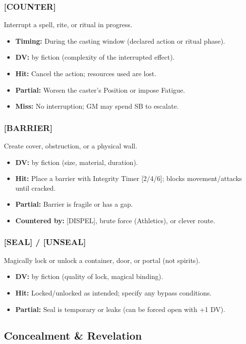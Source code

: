 \subsubsection{[COUNTER]}
Interrupt a spell, rite, or ritual in progress.
\begin{itemize}
  \item \textbf{Timing:} During the casting window (declared action or ritual phase).
  \item \textbf{DV:} by fiction (complexity of the interrupted effect).
  \item \textbf{Hit:} Cancel the action; resources used are lost.
  \item \textbf{Partial:} Worsen the caster's Position or impose Fatigue.
  \item \textbf{Miss:} No interruption; GM may spend SB to escalate.
\end{itemize}

\subsubsection{[BARRIER]}
Create cover, obstruction, or a physical wall.
\begin{itemize}
  \item \textbf{DV:} by fiction (size, material, duration).
  \item \textbf{Hit:} Place a barrier with Integrity Timer [2/4/6]; blocks movement/attacks until cracked.
  \item \textbf{Partial:} Barrier is fragile or has a gap.
  \item \textbf{Countered by:} [DISPEL], brute force (Athletics), or clever route.
\end{itemize}

\subsubsection{[SEAL] / [UNSEAL]}
Magically lock or unlock a container, door, or portal (not spirits).
\begin{itemize}
  \item \textbf{DV:} by fiction (quality of lock, magical binding).
  \item \textbf{Hit:} Locked/unlocked as intended; specify any bypass conditions.
  \item \textbf{Partial:} Seal is temporary or leaks (can be forced open with +1 DV).
\end{itemize}

\subsection{Concealment \& Revelation}


